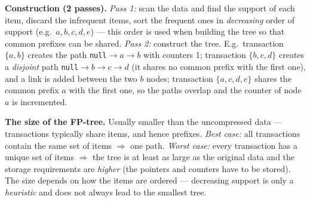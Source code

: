 \documentclass[11pt,a4paper]{article}
\theoremstyle{definition}
\begin{document}
\textbf{Construction (2 passes).} \emph{Pass 1:} scan the data and find the support of each item,
discard the infrequent items, sort the frequent ones in \emph{decreasing} order of support (e.g.\
$a,b,c,d,e$) --- this order is used when building the tree so that common prefixes can be shared.
\emph{Pass 2:} construct the tree. E.g.\ transaction $\{a,b\}$ creates the path
\texttt{null}$\to a\to b$ with counters 1; transaction $\{b,c,d\}$ creates a \emph{disjoint} path
\texttt{null}$\to b\to c\to d$ (it shares no common prefix with the first one), and a link is
added between the two $b$ nodes; transaction $\{a,c,d,e\}$ shares the common prefix $a$ with the
first one, so the paths overlap and the counter of node $a$ is incremented.

\textbf{The size of the FP-tree.} Usually smaller than the uncompressed data --- transactions
typically share items, and hence prefixes. \emph{Best case:} all transactions contain the same set
of items $\Rightarrow$ one path. \emph{Worst case:} every transaction has a unique set of items
$\Rightarrow$ the tree is at least as large as the original data and the storage requirements are
\emph{higher} (the pointers and counters have to be stored). The size depends on how the items
are ordered --- decreasing support is only a \emph{heuristic} and does not always lead to the
smallest tree.
\end{document}
